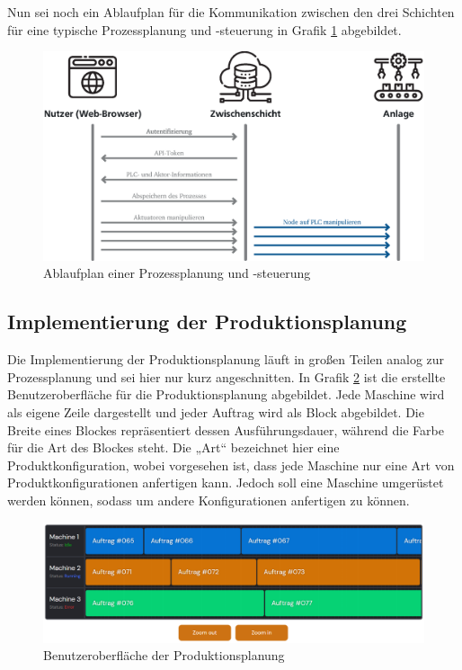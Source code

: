 Nun sei noch ein Ablaufplan für die Kommunikation zwischen den drei Schichten für eine typische Prozessplanung und -steuerung in Grafik \ref{fig:dtaProzessAblaufplan} abgebildet.
%
\begin{figure}[htbp]
	\centering\includegraphics[width=1.0\textwidth]{images/04/dtaProzessAblaufplan.eps}
    \caption{Ablaufplan einer Prozessplanung und -steuerung}
    \label{fig:dtaProzessAblaufplan}
\end{figure}

\subsection{Implementierung der Produktionsplanung}
\label{subsec:produktionsplanung_implementierung}

Die Implementierung der Produktionsplanung läuft in großen Teilen analog zur Prozessplanung und sei hier nur kurz angeschnitten. In Grafik \ref{fig:produktionsplanung} ist die erstellte Benutzeroberfläche für die Produktionsplanung abgebildet. Jede Maschine wird als eigene Zeile dargestellt und jeder Auftrag wird als Block abgebildet. Die Breite eines Blockes repräsentiert dessen Ausführungsdauer, während die Farbe für die Art des Blockes steht. Die „Art“ bezeichnet hier eine Produktkonfiguration, wobei vorgesehen ist, dass jede Maschine nur eine Art von Produktkonfigurationen anfertigen kann. Jedoch soll eine Maschine umgerüstet werden können, sodass um andere Konfigurationen anfertigen zu können.
%
\begin{figure}[htbp]
	\centering\includegraphics[width=1.0\textwidth]{images/05/Produktionsplanungs.png}
    \caption{Benutzeroberfläche der Produktionsplanung}
    \label{fig:produktionsplanung}
\end{figure}

